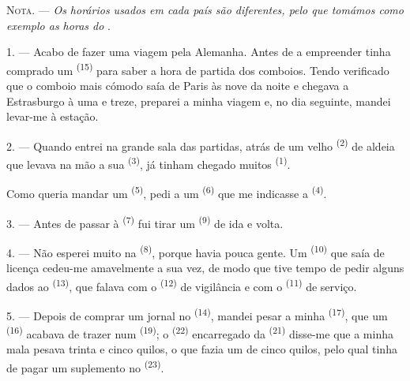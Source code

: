 %

\VUsaut{4.0mm}
\VUsaut{2.4mm}
\VUsaut{3.4mm}
\textsc{Nota.} --- \textit{Os horários usados em cada país são
diferentes, pelo que tomámos como exemplo as horas do} .

1. --- Acabo de fazer uma viagem pela Alemanha. Antes de a empreender
tinha comprado um  \textsuperscript{(15)} para saber a
hora de partida dos comboios. Tendo verificado que o comboio mais cómodo
saía de Paris às nove da noite e chegava a Estrasburgo à uma e treze,
preparei a minha viagem e, no dia seguinte, mandei levar-me à estação.

2. --- Quando entrei na grande sala das partidas, atrás de um velho
 \textsuperscript{(2)} de aldeia que levava na mão a sua  \textsuperscript{(3)}, já tinham chegado muitos 
\textsuperscript{(1)}.

Como queria mandar um  \textsuperscript{(5)}, pedi a um
 \textsuperscript{(6)} que me indicasse a  \textsuperscript{(4)}.

3. --- Antes de passar à  \textsuperscript{(7)} fui tirar um
 \textsuperscript{(9)} de ida e volta.

4. --- Não esperei muito na  \textsuperscript{(8)}, porque havia
pouca gente. Um  \textsuperscript{(10)} que saía de licença cedeu-me
amavelmente a sua vez, de modo que tive tempo de pedir alguns dados ao
 \textsuperscript{(13)}, que falava com o
 \textsuperscript{(12)} de vigilância e com o 
\textsuperscript{(11)} de serviço.

\VUsaut{3.0mm}

5. --- Depois de comprar um jornal no 
\textsuperscript{(14)}, mandei pesar a minha  \textsuperscript{(17)}, que
um  \textsuperscript{(16)} acabava de trazer num 
\textsuperscript{(19)}; o  \textsuperscript{(22)} encarregado da
 \textsuperscript{(21)} disse-me que a minha mala pesava trinta e
cinco quilos, o que fazia um  de cinco quilos, pelo qual
tinha de pagar um suplemento no 
\textsuperscript{(23)}.

